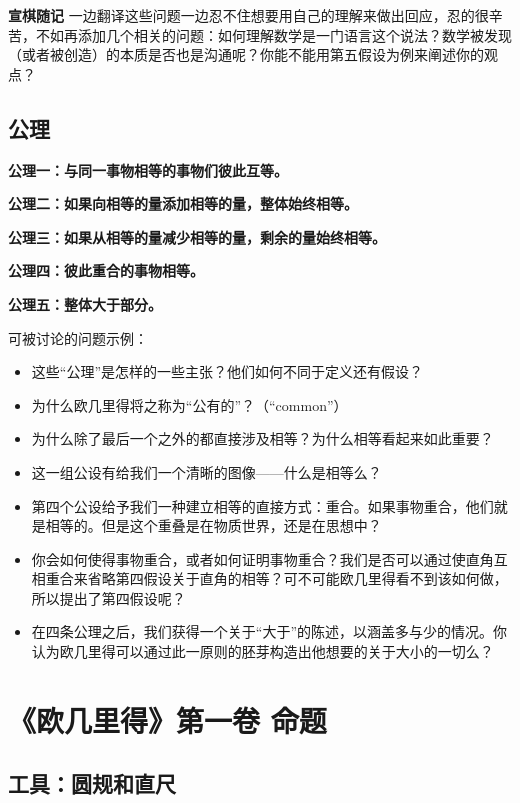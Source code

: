\documentclass[
]{book}
\begin{document}
\textbf{宣棋随记} 一边翻译这些问题一边忍不住想要用自己的理解来做出回应，忍的很辛苦，不如再添加几个相关的问题：如何理解数学是一门语言这个说法？数学被发现（或者被创造）的本质是否也是沟通呢？你能不能用第五假设为例来阐述你的观点？

\hypertarget{ux516cux7406}{%
\section{公理}\label{ux516cux7406}}

\textbf{公理一：与同一事物相等的事物们彼此互等。}

\textbf{公理二：如果向相等的量添加相等的量，整体始终相等。}

\textbf{公理三：如果从相等的量减少相等的量，剩余的量始终相等。}

\textbf{公理四：彼此重合的事物相等。}

\textbf{公理五：整体大于部分。}

可被讨论的问题示例：

\begin{itemize}
\item
  这些``公理''是怎样的一些主张？他们如何不同于定义还有假设？
\item
  为什么欧几里得将之称为``公有的''？（``common''）
\item
  为什么除了最后一个之外的都直接涉及相等？为什么相等看起来如此重要？
\item
  这一组公设有给我们一个清晰的图像------什么是相等么？
\item
  第四个公设给予我们一种建立相等的直接方式：重合。如果事物重合，他们就是相等的。但是这个重叠是在物质世界，还是在思想中？
\item
  你会如何使得事物重合，或者如何证明事物重合？我们是否可以通过使直角互相重合来省略第四假设关于直角的相等？可不可能欧几里得看不到该如何做，所以提出了第四假设呢？
\item
  在四条公理之后，我们获得一个关于``大于''的陈述，以涵盖多与少的情况。你认为欧几里得可以通过此一原则的胚芽构造出他想要的关于大小的一切么？
\end{itemize}

\hypertarget{ux6b27ux51e0ux91ccux5f97ux7b2cux4e00ux5377-ux547dux9898}{%
\chapter{《欧几里得》第一卷 命题}\label{ux6b27ux51e0ux91ccux5f97ux7b2cux4e00ux5377-ux547dux9898}}

\hypertarget{instruments}{%
\section*{工具：圆规和直尺}\label{instruments}}
\end{document}
